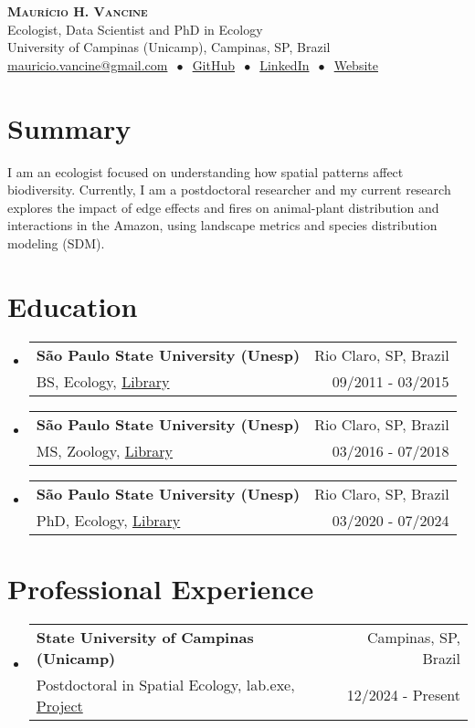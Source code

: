 \documentclass[letterpaper,11pt]{article}
\makeatletter
\newcommand{\cvheading}[4]{
  \vspace{-2pt}\item
    \begin{tabular*}{\textwidth}[t]{l@{\extracolsep{\fill}}r}
      \textbf{#1} & #2\\
      \small#3 & \small #4\\
    \end{tabular*}\vspace{-7pt}
}
\newcommand{\cvheadingstart}{\begin{itemize}[leftmargin=0in, label={}]}
\newcommand{\cvheadingend}{\end{itemize}}
\makeatother
\begin{document}
\begin{center}
  \textbf{\LARGE\scshape Maurício H. Vancine}\\
  \vspace{5pt}\small
  Ecologist, Data Scientist and PhD in Ecology\\
  University of Campinas (Unicamp), Campinas, SP, Brazil\\
  \href{mailto:}{mauricio.vancine@gmail.com}
  $\ \bullet\ $ 
  \href{https://github.com/mauriciovancine}{GitHub}
  $\ \bullet\ $
  \href{https://www.linkedin.com/in/mauricio-vancine/}{LinkedIn}
    $\ \bullet\ $
  \href{https://mauriciovancine.github.io}{Website}
\end{center}

\section{Summary}
I am an ecologist focused on understanding how spatial patterns affect biodiversity. Currently, I am a postdoctoral researcher and my current research explores the impact of edge effects and fires on animal-plant distribution and interactions in the Amazon, using landscape metrics and species distribution modeling (SDM).

\section{Education}
\cvheadingstart
  \cvheading
    {São Paulo State University (Unesp)}{Rio Claro, SP, Brazil}
    {BS, Ecology, \href{http://hdl.handle.net/11449/138991}{Library}}{09/2011 - 03/2015}
  \cvheading
    {São Paulo State University (Unesp)}{Rio Claro, SP, Brazil}
    {MS, Zoology, \href{http://hdl.handle.net/11449/154993}{Library}}{03/2016 - 07/2018}
  \cvheading
    {São Paulo State University (Unesp)}{Rio Claro, SP, Brazil}
    {PhD, Ecology, \href{https://hdl.handle.net/11449/256726}{Library}}{03/2020 - 07/2024}
\cvheadingend

\section{Professional Experience}
\cvheadingstart
  \cvheading
    {State University of Campinas (Unicamp)}{Campinas, SP, Brazil}
    {Postdoctoral in Spatial Ecology, lab.exe, \href{https://bv.fapesp.br/pt/auxilios/113861/interacoes-entre-plantas-e-animais-e-os-impactos-em-cascata-da-fragmentacao-da-floresta-amazonica/}{Project}}{12/2024 - Present}
\cvheadingend
\end{document}

